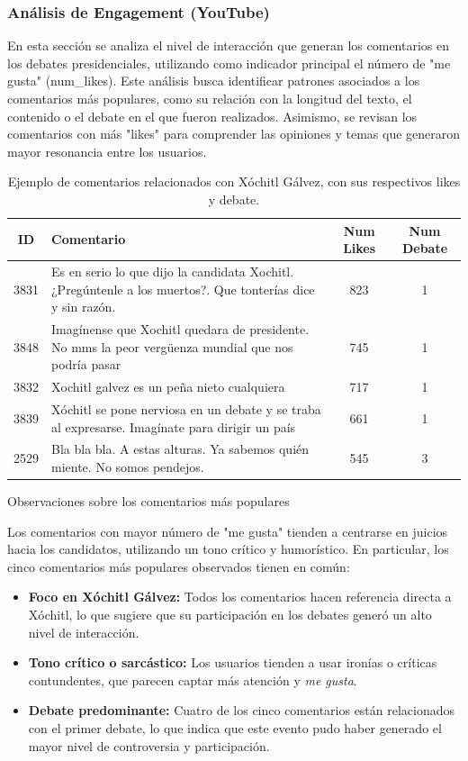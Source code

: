 \documentclass[10pt, a4paper]{article}
\begin{document}
	
	\subsubsection{Análisis de Engagement (YouTube)}
	
	En esta sección se analiza el nivel de interacción que generan los comentarios en los debates presidenciales, utilizando como indicador principal el número de "me gusta" (num\_likes). Este análisis busca identificar patrones asociados a los comentarios más populares, como su relación con la longitud del texto, el contenido o el debate en el que fueron realizados. Asimismo, se revisan los comentarios con más "likes" para comprender las opiniones y temas que generaron mayor resonancia entre los usuarios.
	
	\begin{table}[H]
		\centering
		\begin{tabular}{|c|p{11cm}|c|c|}
			\hline
			\textbf{ID} & \textbf{Comentario} & \textbf{Num Likes} & \textbf{Num Debate} \\ \hline
			3831 & Es en serio lo que dijo la candidata Xochitl. ¿Pregúntenle a los muertos?. Que tonterías dice y sin razón. & 823 & 1 \\ \hline
			3848 & Imagínense que Xochitl quedara de presidente. No mms la peor vergüenza mundial que nos podría pasar & 745 & 1 \\ \hline
			3832 & Xochitl galvez es un peña nieto cualquiera & 717 & 1 \\ \hline
			3839 & Xóchitl se pone nerviosa en un debate y se traba al expresarse. Imagínate para dirigir un país & 661 & 1 \\ \hline
			2529 & Bla bla bla. A estas alturas. Ya sabemos quién miente. No somos pendejos. & 545 & 3 \\ \hline
		\end{tabular}
		\caption{Ejemplo de comentarios relacionados con Xóchitl Gálvez, con sus respectivos likes y debate.}
		\label{tab:comentarios_xochitl}
	\end{table}
	
	Observaciones sobre los comentarios más populares
	
	Los comentarios con mayor número de "me gusta" tienden a centrarse en juicios hacia los candidatos, utilizando un tono crítico y humorístico. En particular, los cinco comentarios más populares observados tienen en común:
	
	\begin{itemize}
		\item \textbf{Foco en Xóchitl Gálvez:} Todos los comentarios hacen referencia directa a Xóchitl, lo que sugiere que su participación en los debates generó un alto nivel de interacción.
		\item \textbf{Tono crítico o sarcástico:} Los usuarios tienden a usar ironías o críticas contundentes, que parecen captar más atención y \textit{me gusta}.
		\item \textbf{Debate predominante:} Cuatro de los cinco comentarios están relacionados con el primer debate, lo que indica que este evento pudo haber generado el mayor nivel de controversia y participación.
	\end{itemize}
	
\end{document}
